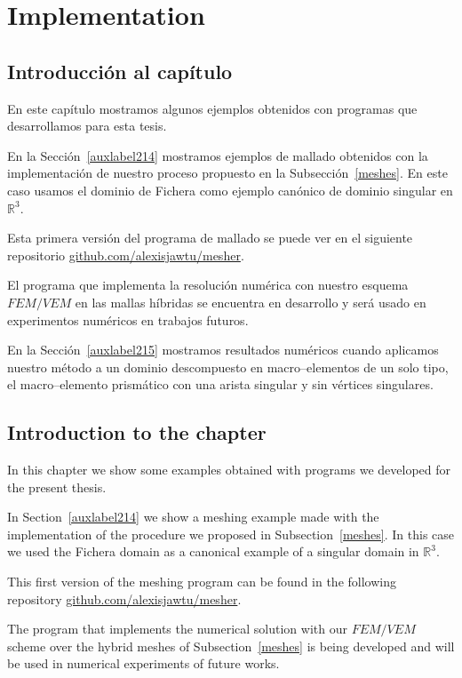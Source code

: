 \chapter{Implementation}

\section*{Introducci\'on al cap\'itulo}
En este cap\'itulo mostramos algunos ejemplos obtenidos 
con programas que desarrollamos para esta tesis.

En la Secci\'on~\ref{auxlabel214} mostramos ejemplos de mallado 
obtenidos con la implementaci\'on de nuestro proceso propuesto 
en la Subsecci\'on~\ref{meshes}. 
En este caso usamos el dominio de Fichera como ejemplo can\'onico 
de dominio singular en $\mathbb{R}^3$.

Esta primera versi\'on del programa de mallado se puede ver en el siguiente 
repositorio \href{https://github.com/alexisjawtu/mesher}{github.com/alexisjawtu/mesher}.

El programa que implementa la resoluci\'on num\'erica con nuestro esquema
$FEM/VEM$ en las mallas h\'ibridas se encuentra en desarrollo y ser\'a
usado en experimentos num\'ericos en trabajos futuros.

En la Secci\'on~\ref{auxlabel215} mostramos resultados num\'ericos
cuando aplicamos nuestro m\'etodo a un dominio descompuesto en macro--elementos
de un solo tipo, el macro--elemento prism\'atico con una arista singular y sin v\'ertices
singulares.

\section*{Introduction to the chapter}
In this chapter we show some examples obtained with programs we 
developed for the present thesis.

In Section~\ref{auxlabel214} we show a meshing example made with the implementation
of the procedure we proposed in Subsection~\ref{meshes}. In this case we used
the Fichera domain as a canonical example of a singular domain in $\mathbb{R}^3$.

This first version of the meshing program can be found in the following repository
\href{https://github.com/alexisjawtu/mesher}{github.com/alexisjawtu/mesher}.

The program that implements the numerical solution with our $FEM/VEM$ scheme
over the hybrid meshes of Subsection~\ref{meshes} is being developed and will
be used in numerical experiments of future works.

